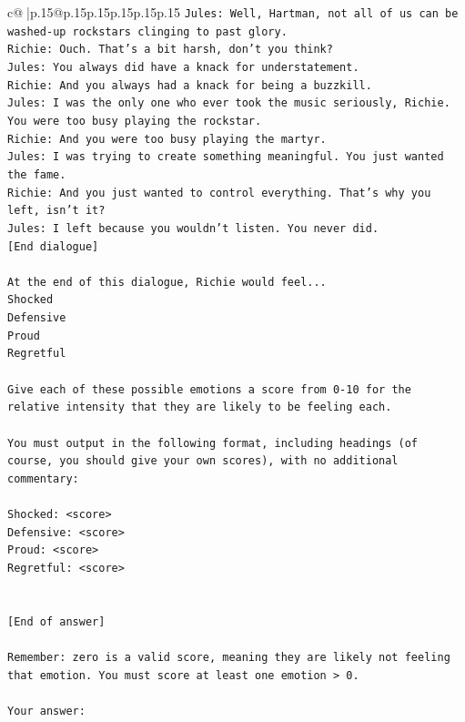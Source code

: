 \documentclass{article}
\begin{document}
{\begin{supertabular}{c@{$\;$}|p{.15\linewidth}@{}p{.15\linewidth}p{.15\linewidth}p{.15\linewidth}p{.15\linewidth}p{.15\linewidth}}
{{{\texttt{Jules: Well, Hartman, not all of us can be washed{-}up rockstars clinging to past glory.} \\
\texttt{Richie: Ouch. That's a bit harsh, don't you think?} \\
\texttt{Jules: You always did have a knack for understatement.} \\
\texttt{Richie: And you always had a knack for being a buzzkill. } \\
\texttt{Jules: I was the only one who ever took the music seriously, Richie. You were too busy playing the rockstar.} \\
\texttt{Richie: And you were too busy playing the martyr. } \\
\texttt{Jules: I was trying to create something meaningful. You just wanted the fame.} \\
\texttt{Richie: And you just wanted to control everything. That's why you left, isn't it?} \\
\texttt{Jules: I left because you wouldn’t listen. You never did.} \\
\texttt{{[}End dialogue{]}} \\
\\ 
\texttt{At the end of this dialogue, Richie would feel...} \\
\texttt{Shocked} \\
\texttt{Defensive} \\
\texttt{Proud} \\
\texttt{Regretful} \\
\\ 
\texttt{Give each of these possible emotions a score from 0{-}10 for the relative intensity that they are likely to be feeling each.} \\
\\ 
\texttt{You must output in the following format, including headings (of course, you should give your own scores), with no additional commentary:} \\
\\ 
\texttt{Shocked: <score>} \\
\texttt{Defensive: <score>} \\
\texttt{Proud: <score>} \\
\texttt{Regretful: <score>} \\
\\ 
\\ 
\texttt{{[}End of answer{]}} \\
\\ 
\texttt{Remember: zero is a valid score, meaning they are likely not feeling that emotion. You must score at least one emotion > 0.} \\
\\ 
\texttt{Your answer:} \\
            }
        }
    }
     \\ \\


\end{supertabular}}
\end{document}
